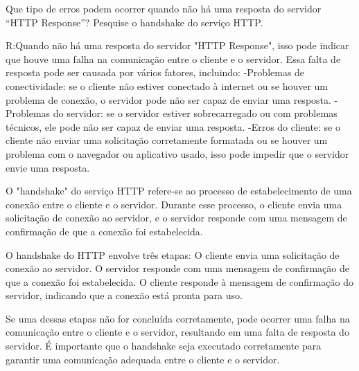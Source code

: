 Que tipo de erros podem ocorrer quando não há uma
resposta do servidor “HTTP Response”? Pesquise o
handshake do serviço HTTP.

R:Quando não há uma resposta do servidor "HTTP Response", isso pode indicar que houve uma falha na comunicação entre o cliente e o servidor. Essa falta de resposta pode ser causada por vários fatores, incluindo:
-Problemas de conectividade: se o cliente não estiver conectado à internet ou se houver um problema de conexão, o servidor pode não ser capaz de enviar uma resposta.
-Problemas do servidor: se o servidor estiver sobrecarregado ou com problemas técnicos, ele pode não ser capaz de enviar uma resposta.
-Erros do cliente: se o cliente não enviar uma solicitação corretamente formatada ou se houver um problema com o navegador ou aplicativo usado, isso pode impedir que o servidor envie uma resposta.

O "handshake" do serviço HTTP refere-se ao processo de estabelecimento de uma conexão 
entre o cliente e o servidor. 
Durante esse processo, o cliente envia uma solicitação de conexão ao servidor, 
e o servidor responde com uma mensagem de confirmação de que a conexão foi estabelecida.

O handshake do HTTP envolve três etapas:
O cliente envia uma solicitação de conexão ao servidor.
O servidor responde com uma mensagem de confirmação de que a conexão foi estabelecida.
O cliente responde à mensagem de confirmação do servidor, indicando que a conexão está pronta para uso.

Se uma dessas etapas não for concluída corretamente, 
pode ocorrer uma falha na comunicação entre o cliente e o servidor, 
resultando em uma falta de resposta do servidor. 
É importante que o handshake seja executado corretamente para garantir uma comunicação 
adequada entre o cliente e o servidor.